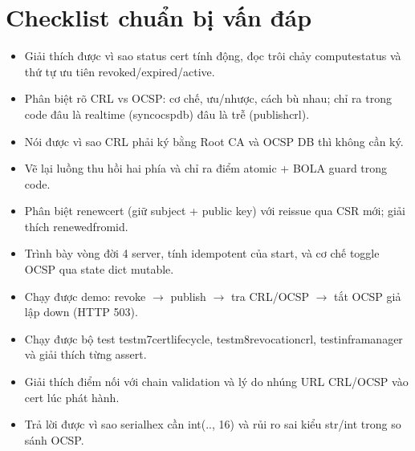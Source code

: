 \documentclass[12pt,a4paper]{article}
\newcommand{\code}[1]{{\ttfamily\small\def\_{\textunderscore\discretionary{}{}{}}#1}}
\begin{document}
\section{Checklist chuẩn bị vấn đáp}

\begin{itemize}
  \item[\textbf{$\square$}] Giải thích được vì sao status cert tính động, đọc
    trôi chảy \code{\_compute\_status} và thứ tự ưu tiên revoked/expired/active.
  \item[\textbf{$\square$}] Phân biệt rõ CRL vs OCSP: cơ chế, ưu/nhược, cách bù
    nhau; chỉ ra trong code đâu là realtime (\code{sync\_ocsp\_db}) đâu là trễ
    (\code{publish\_crl}).
  \item[\textbf{$\square$}] Nói được vì sao CRL phải ký bằng Root CA và OCSP DB
    thì không cần ký.
  \item[\textbf{$\square$}] Vẽ lại luồng thu hồi hai phía và chỉ ra điểm atomic +
    BOLA guard trong code.
  \item[\textbf{$\square$}] Phân biệt \code{renew\_cert} (giữ subject + public
    key) với reissue qua CSR mới; giải thích \code{renewed\_from\_id}.
  \item[\textbf{$\square$}] Trình bày vòng đời 4 server, tính idempotent của
    start, và cơ chế toggle OCSP qua state dict mutable.
  \item[\textbf{$\square$}] Chạy được demo: revoke $\to$ publish $\to$ tra
    CRL/OCSP $\to$ tắt OCSP giả lập down (HTTP 503).
  \item[\textbf{$\square$}] Chạy được bộ test \code{test\_m7\_cert\_lifecycle},
    \code{test\_m8\_revocation\_crl}, \code{test\_infra\_manager} và giải thích
    từng assert.
  \item[\textbf{$\square$}] Giải thích điểm nối với chain validation và lý do
    nhúng URL CRL/OCSP vào cert lúc phát hành.
  \item[\textbf{$\square$}] Trả lời được vì sao \code{serial\_hex} cần
    \code{int(.., 16)} và rủi ro sai kiểu str/int trong so sánh OCSP.
\end{itemize}
\end{document}
